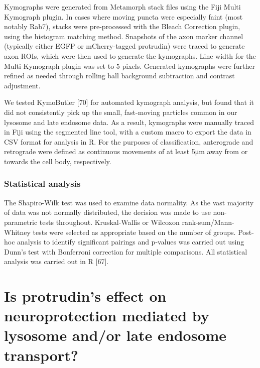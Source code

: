 \documentclass[
  12pt,
  a4paper,
]{book}
\renewcommand{\chaptermark}[1]{\markboth{#1}{}}
\begin{document}
Kymographs were generated from Metamorph stack files using the Fiji Multi Kymograph plugin. In cases where moving puncta were especially faint (most notably Rab7), stacks were pre-processed with the Bleach Correction plugin, using the histogram matching method. Snapshots of the axon marker channel (typically either EGFP or mCherry-tagged protrudin) were traced to generate axon ROIs, which were then used to generate the kymographs. Line width for the Multi Kymograph plugin was set to 5 pixels. Generated kymographs were further refined as needed through rolling ball background subtraction and contrast adjustment.

We tested KymoButler {[}70{]} for automated kymograph analysis, but found that it did not consistently pick up the small, fast-moving particles common in our lysosome and late endosome data. As a result, kymographs were manually traced in Fiji using the segmented line tool, with a custom macro to export the data in CSV format for analysis in R. For the purposes of classification, anterograde and retrograde were defined as continuous movements of at
least 5μm away from or towards the cell body, respectively.

\hypertarget{statistical-analysis}{%
\subsection{Statistical analysis}\label{statistical-analysis}}

The Shapiro-Wilk test was used to examine data normality. As the vast majority of data was not normally distributed, the decision was made to use non-parametric tests throughout. Kruskal-Wallis or Wilcoxon rank-sum/Mann-Whitney tests were selected as appropriate based on the number of groups. Post-hoc analysis to identify significant pairings and p-values was carried out using Dunn's test with Bonferroni correction for multiple comparisons. All statistical analysis was carried out in R {[}67{]}.

\hypertarget{is-protrudins-effect-on-neuroprotection-mediated-by-lysosome-andor-late-endosome-transport}{%
\chapter{Is protrudin's effect on neuroprotection mediated by lysosome and/or late endosome transport?}\label{is-protrudins-effect-on-neuroprotection-mediated-by-lysosome-andor-late-endosome-transport}}

\chaptermark{Lysosome and late endosome transport}
\end{document}
